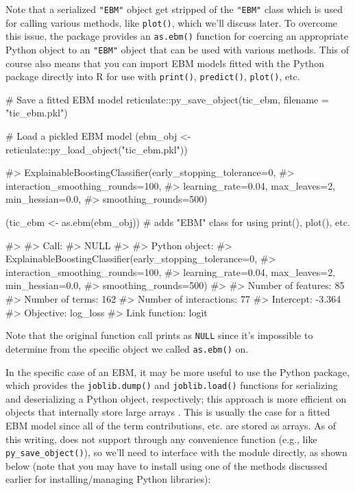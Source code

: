 Note that a serialized \texttt{"EBM"} object get stripped of the
\texttt{"EBM"} class which is used for calling various methods, like
\texttt{plot()}, which we'll discuss later. To overcome this issue, the
 package provides an \texttt{as.ebm()} function for coercing an
appropriate Python object to an \texttt{"EBM"} object that can be used
with various methods. This of course also means that you can import EBM
models fitted with the  Python package directly into R
for use with \texttt{print()}, \texttt{predict()}, \texttt{plot()}, etc.

\begin{Schunk}
\begin{Sinput}
# Save a fitted EBM model
reticulate::py_save_object(tic_ebm, filename = "tic_ebm.pkl")

# Load a pickled EBM model
(ebm_obj <- reticulate::py_load_object("tic_ebm.pkl"))
\end{Sinput}
\begin{Soutput}
#> ExplainableBoostingClassifier(early_stopping_tolerance=0,
#>                               interaction_smoothing_rounds=100,
#>                               learning_rate=0.04, max_leaves=2, min_hessian=0.0,
#>                               smoothing_rounds=500)
\end{Soutput}
\begin{Sinput}
(tic_ebm <- as.ebm(ebm_obj))  # adds "EBM" class for using print(), plot(), etc.
\end{Sinput}
\begin{Soutput}
#> 
#> Call:
#> NULL
#> 
#> Python object:
#> ExplainableBoostingClassifier(early_stopping_tolerance=0,
#>                               interaction_smoothing_rounds=100,
#>                               learning_rate=0.04, max_leaves=2, min_hessian=0.0,
#>                               smoothing_rounds=500)
#> 
#> Number of features: 85 
#> Number of terms: 162 
#> Number of interactions: 77 
#> Intercept: -3.364 
#> Objective: log_loss 
#> Link function: logit
\end{Soutput}
\end{Schunk}

Note that the original function call prints as \texttt{NULL} since it's
impossible to determine from the specific object we called
\texttt{as.ebm()} on.

In the specific case of an EBM, it may be more useful to use the
 Python package, which provides the \texttt{joblib.dump()}
and \texttt{joblib.load()} functions for serializing and deserializing a
Python object, respectively; this approach is more efficient on objects
that internally store large  arrays \citep{Py-numpy}. This is
usually the case for a fitted EBM model since all of the term
contributions, etc. are stored as  arrays. As of this
writing,  does not support  through any
convenience function (e.g., like \texttt{py\_save\_object()}), so we'll
need to interface with the module directly, as shown below (note that
you may have to install  using one of the methods discussed
earlier for installing/managing Python libraries):

